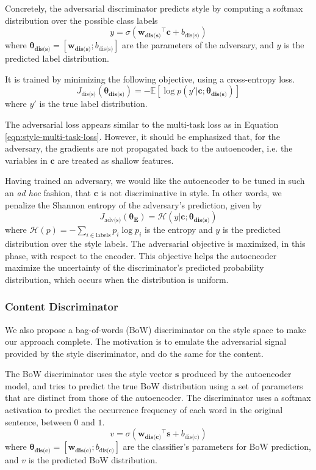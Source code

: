\documentclass[letterpaper]{article} %
\newcommand{\loss}[1]{J_{\text{#1}}}
\newcommand{\nnweight}[1]{\bm{\theta_{\text{#1}}}}
\newcommand{\weight}[1]{\bm{w_{\text{#1}}}}
\newcommand{\bias}[1]{b_{\text{#1}}}
\begin{document}
Concretely, the adversarial discriminator predicts style by computing a softmax distribution over the possible class labels
\begin{equation}
	y = \sigma({\weight{dis(s)}}^\top \bm c + \bias{dis(s)})
\end{equation}
where $\nnweight{dis(s)}=[\weight{dis(s)}; \bias{dis(s)}]$ are the parameters of the adversary, and $y$ is the predicted label distribution.

It is trained by minimizing the following objective, using a cross-entropy loss.
\begin{equation} \label{eqn:adv-disc-loss}
	\loss{dis(s)} (\nnweight{dis(s)}) =
	- \mathbb{E} [\log p(y' | \bm c; \nnweight{dis(s)})]
\end{equation}
where $y'$ is the true label distribution.

The adversarial loss appears similar to the multi-task loss as in Equation \ref{eqn:style-multi-task-loss}.
However, it should be emphasized that, for the adversary, the gradients are not propagated back to the autoencoder, i.e. the variables in $\bm c$ are treated as shallow features.

Having trained an adversary, we would like the autoencoder to be tuned in such an \textit{ad hoc} fashion, that $\bm c$ is not discriminative in style.
In other words, we penalize the Shannon entropy of the adversary's prediction, given by
\begin{equation}
	\loss{adv(s)}(\nnweight{E})=\mathcal{H}(y|\bm c; \nnweight{dis(s)})
\end{equation}
where $\mathcal{H}(p)=-\sum_{i\in\text{labels}}p_i\log p_i$ is the entropy and $y$ is the predicted distribution over the style labels.
The adversarial objective is maximized, in this phase, with respect to the encoder.
This objective helps the autoencoder maximize the uncertainty of the discriminator's predicted probability distribution, which occurs when the distribution is uniform.

\subsubsection{Content Discriminator} \label{ssec:adversarial-content-objective}

We also propose a bag-of-words (BoW) discriminator on the style space to make our approach complete.
The motivation is to emulate the adversarial signal provided by the style discriminator, and do the same for the content.

The BoW discriminator uses the style vector $\bm s$ produced by the autoencoder model, and tries to predict the true BoW distribution using a set of parameters that are distinct from those of the autoencoder.
The discriminator uses a softmax activation to predict the occurrence frequency of each word in the original sentence, between $0$ and $1$.
\begin{equation}
	v = \sigma({\weight{dis(c)}}^\top \bm s + \bias{dis(c)})
\end{equation}
where $\nnweight{dis(c)}=[\weight{dis(c)}; \bias{dis(c)}]$ are the classifier's parameters for BoW prediction, and $v$ is the predicted BoW distribution.
\end{document}
